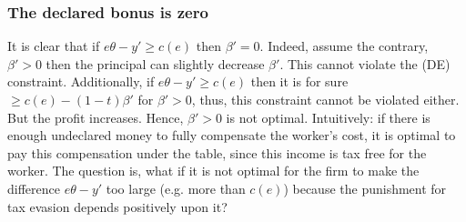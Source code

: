 \documentclass[a4paper]{article}
\begin{document}
\subsubsection{The declared bonus is zero}
It is clear that if $e \theta - y' \ge c(e)$ then $\beta' = 0$. Indeed, assume the contrary, $\beta' > 0$ then the principal can slightly decrease $\beta'$. This cannot violate the (DE) constraint. Additionally, if $e\theta - y' \ge c(e)$ then it is for sure $\ge c(e) - (1 - t)\beta'$ for $\beta'>0$, thus, this constraint cannot be violated either. But the profit increases. Hence, $\beta'>0$ is not optimal. Intuitively: if there is enough undeclared money to fully compensate the worker's cost, it is optimal to pay this compensation under the table, since this income is tax free for the worker. The question is, what if it is not optimal for the firm to make the difference $e\theta - y'$ too large (e.g. more than $c(e)$) because the punishment for tax evasion depends positively upon it?
\end{document}
